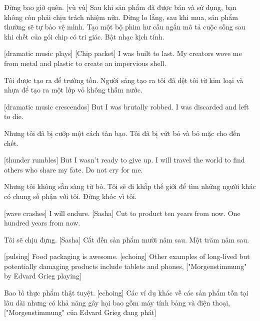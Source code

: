 \documentclass[a4paper]{article}
\begin{document}
	\begin{vietnamese-v2}
		[đập]
		[Sasha] Đừng bao giờ quên.
		[vù vù]
		Sau khi sản phẩm đã được bán và sử dụng, bạn không còn phải chịu trách nhiệm nữa.
		Đừng lo lắng, sau khi mua, sản phẩm thường sẽ tự bảo vệ mình.
		Tạo một bộ phim hư cấu ngắn mô tả cuộc sống sau khi chết của gói chip có tri giác.
		Bật nhạc kịch tính.
	\end{vietnamese-v2}
	
	[dramatic music plays]
	[Chip packet] I was built to last.
	My creators wove me from metal and plastic to create an impervious shell.
	
	\begin{vietnamese-v2}
		 Tôi được tạo ra để trường tồn.
		Người sáng tạo ra tôi đã dệt tôi từ kim loại và nhựa để tạo ra một lớp vỏ không thấm nước.
	\end{vietnamese-v2}
	
	[dramatic music crescendos]
	But I was brutally robbed.
	I was discarded and left to die.
	
	\begin{vietnamese-v2}
		Nhưng tôi đã bị cướp một cách tàn bạo.
		Tôi đã bị vứt bỏ và bỏ mặc cho đến chết.
	\end{vietnamese-v2}
	
	[thunder rumbles]
	But I wasn't ready to give up.
	I will travel the world
	to find others who share my fate.
	Do not cry for me.
	
	\begin{vietnamese-v2}
		Nhưng tôi không sẵn sàng từ bỏ.
		Tôi sẽ đi khắp thế giới
		để tìm những người khác có chung số phận với tôi.
		Đừng khóc vì tôi.
	\end{vietnamese-v2}
	
	[wave crashes]
	I will endure.
	[Sasha] Cut to product ten years from now.
	One hundred years from now.
	
	\begin{vietnamese-v2}
		[sóng vỗ]
		Tôi sẽ chịu đựng.
		[Sasha] Cắt đến sản phẩm mười năm sau.
		Một trăm năm sau.
	\end{vietnamese-v2}
	
	[pulsing]
	Food packaging is awesome. [echoing]
	Other examples of long-lived but potentially damaging products include tablets and phones, ["Morgenstimmung" by Edvard Grieg playing]
	
	\begin{vietnamese-v2}
		[pulsing]
		Bao bì thực phẩm thật tuyệt. [echoing]
		Các ví dụ khác về các sản phẩm tồn tại lâu dài nhưng có khả năng gây hại bao gồm máy tính bảng và điện thoại, ["Morgenstimmung" của Edvard Grieg đang phát]
	\end{vietnamese-v2}
	
\end{document}
